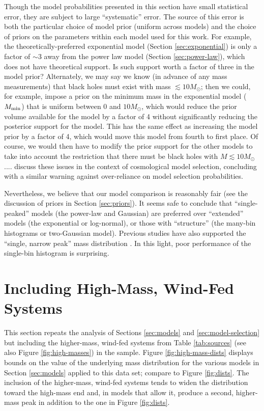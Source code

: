 \documentclass[preprint]{aastex}
\newcommand{\Msun}{M_\odot}
\newcommand{\Mmin}{M_{\textnormal{min}}}
\begin{document}
Though the model probabilities presented in this section have small
statistical error, they are subject to large ``systematic'' error.
The source of this error is both the particular choice of model prior
(uniform across models) and the choice of priors on the parameters
within each model used for this work.  For example, the
theoretically-preferred exponential model (Section
\ref{sec:exponential}) is only a factor of $\sim 3$ away from the
power law model (Section \ref{sec:power-law}), which does not have
theoretical support.  Is such support worth a factor of three in the
model prior?  Alternately, we may say we know (in advance of any mass
measurements) that black holes must exist with mass $\lesssim
10\Msun$; then we could, for example, impose a prior on the minimum
mass in the exponential model ($\Mmin$) that is uniform between $0$
and $10 \Msun$, which would reduce the prior volume available for the
model by a factor of 4 without significantly reducing the posterior
support for the model.  This has the same effect as increasing the
model prior by a factor of 4, which would move this model from fourth
to first place.  Of course, we would then have to modify the prior
support for the other models to take into account the restriction that
there must be black holes with $M \lesssim 10\Msun$....
\citet{Linder2008} discuss these issues in the context of cosmological
model selection, concluding with a similar warning against
over-reliance on model selection probabilities.

Nevertheless, we believe that our model comparison is reasonably fair
(see the discussion of priors in Section \ref{sec:priors}).  It seems
safe to conclude that ``single-peaked'' models (the power-law and
Gaussian) are preferred over ``extended'' models (the exponential or
log-normal), or those with ``structure'' (the many-bin histograms or
two-Gaussian model).  Previous studies have also supported the
``single, narrow peak'' mass distribution \citep{Bailyn1998,Ozel2010}.
In this light, poor performance of the single-bin histogram is
surprising.

\section{Including High-Mass, Wind-Fed Systems}
\label{sec:higher-mass}

This section repeats the analysis of Sections \ref{sec:models} and
\ref{sec:model-selection} but including the higher-mass, wind-fed
systems from Table \ref{tab:sources} (see also Figure
\ref{fig:high-masses}) in the sample.  Figure
\ref{fig:high-mass-dists} displays bounds on the value of the
underlying mass distribution for the various models in Section
\ref{sec:models} applied to this data set; compare to Figure
\ref{fig:dists}.  The inclusion of the higher-mass, wind-fed systems
tends to widen the distribution toward the high-mass end and, in
models that allow it, produce a second, higher-mass peak in addition
to the one in Figure \ref{fig:dists}.
\end{document}
